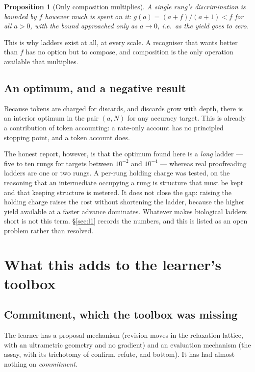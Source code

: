 \documentclass[11pt]{article}
\theoremstyle{plain}
\newtheorem{proposition}[theorem]{Proposition}
\theoremstyle{definition}
\theoremstyle{remark}
\begin{document}
\begin{proposition}[Only composition multiplies]
\label{prop:onlycomp}
A single rung's discrimination is bounded by $f$ however much is spent on it:
$g(a) = (a+f)/(a+1) < f$ for all $a > 0$, with the bound approached only as
$a \to 0$, i.e.\ as the yield goes to zero.
\end{proposition}

This is why ladders exist at all, at every scale. A recogniser that wants
better than $f$ has no option but to compose, and composition is the only
operation available that multiplies.

\subsection{An optimum, and a negative result}
\label{sec:negative}

Because tokens are charged for discards, and discards grow with depth, there
is an interior optimum in the pair $(a, N)$ for any accuracy target. This is
already a contribution of token accounting: a rate-only account has no
principled stopping point, and a token account does.

The honest report, however, is that the optimum found here is a \emph{long}
ladder --- five to ten rungs for targets between $10^{-2}$ and $10^{-4}$ ---
whereas real proofreading ladders are one or two rungs. A per-rung holding
charge was tested, on the reasoning that an intermediate occupying a rung is
structure that must be kept and that keeping structure is metered. It does not
close the gap: raising the holding charge raises the cost without shortening
the ladder, because the higher yield available at a faster advance dominates.
Whatever makes biological ladders short is not this term. \S\ref{sec:l1}
records the numbers, and this is listed as an open problem rather than
resolved.

\section{What this adds to the learner's toolbox}
\label{sec:toolbox}

\subsection{Commitment, which the toolbox was missing}

The learner has a proposal mechanism (revision moves in the relaxation
lattice, with an ultrametric geometry and no gradient) and an evaluation
mechanism (the assay, with its trichotomy of confirm, refute, and bottom). It
has had almost nothing on \emph{commitment}.
\end{document}
